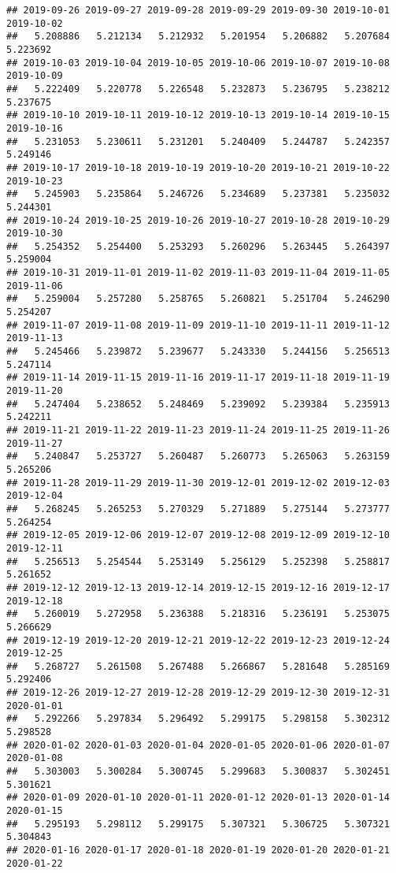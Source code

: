 \documentclass[
]{article}
\begin{document}
\begin{verbatim}
## 2019-09-26 2019-09-27 2019-09-28 2019-09-29 2019-09-30 2019-10-01 2019-10-02 
##   5.208886   5.212134   5.212932   5.201954   5.206882   5.207684   5.223692 
## 2019-10-03 2019-10-04 2019-10-05 2019-10-06 2019-10-07 2019-10-08 2019-10-09 
##   5.222409   5.220778   5.226548   5.232873   5.236795   5.238212   5.237675 
## 2019-10-10 2019-10-11 2019-10-12 2019-10-13 2019-10-14 2019-10-15 2019-10-16 
##   5.231053   5.230611   5.231201   5.240409   5.244787   5.242357   5.249146 
## 2019-10-17 2019-10-18 2019-10-19 2019-10-20 2019-10-21 2019-10-22 2019-10-23 
##   5.245903   5.235864   5.246726   5.234689   5.237381   5.235032   5.244301 
## 2019-10-24 2019-10-25 2019-10-26 2019-10-27 2019-10-28 2019-10-29 2019-10-30 
##   5.254352   5.254400   5.253293   5.260296   5.263445   5.264397   5.259004 
## 2019-10-31 2019-11-01 2019-11-02 2019-11-03 2019-11-04 2019-11-05 2019-11-06 
##   5.259004   5.257280   5.258765   5.260821   5.251704   5.246290   5.254207 
## 2019-11-07 2019-11-08 2019-11-09 2019-11-10 2019-11-11 2019-11-12 2019-11-13 
##   5.245466   5.239872   5.239677   5.243330   5.244156   5.256513   5.247114 
## 2019-11-14 2019-11-15 2019-11-16 2019-11-17 2019-11-18 2019-11-19 2019-11-20 
##   5.247404   5.238652   5.248469   5.239092   5.239384   5.235913   5.242211 
## 2019-11-21 2019-11-22 2019-11-23 2019-11-24 2019-11-25 2019-11-26 2019-11-27 
##   5.240847   5.253727   5.260487   5.260773   5.265063   5.263159   5.265206 
## 2019-11-28 2019-11-29 2019-11-30 2019-12-01 2019-12-02 2019-12-03 2019-12-04 
##   5.268245   5.265253   5.270329   5.271889   5.275144   5.273777   5.264254 
## 2019-12-05 2019-12-06 2019-12-07 2019-12-08 2019-12-09 2019-12-10 2019-12-11 
##   5.256513   5.254544   5.253149   5.256129   5.252398   5.258817   5.261652 
## 2019-12-12 2019-12-13 2019-12-14 2019-12-15 2019-12-16 2019-12-17 2019-12-18 
##   5.260019   5.272958   5.236388   5.218316   5.236191   5.253075   5.266629 
## 2019-12-19 2019-12-20 2019-12-21 2019-12-22 2019-12-23 2019-12-24 2019-12-25 
##   5.268727   5.261508   5.267488   5.266867   5.281648   5.285169   5.292406 
## 2019-12-26 2019-12-27 2019-12-28 2019-12-29 2019-12-30 2019-12-31 2020-01-01 
##   5.292266   5.297834   5.296492   5.299175   5.298158   5.302312   5.298528 
## 2020-01-02 2020-01-03 2020-01-04 2020-01-05 2020-01-06 2020-01-07 2020-01-08 
##   5.303003   5.300284   5.300745   5.299683   5.300837   5.302451   5.301621 
## 2020-01-09 2020-01-10 2020-01-11 2020-01-12 2020-01-13 2020-01-14 2020-01-15 
##   5.295193   5.298112   5.299175   5.307321   5.306725   5.307321   5.304843 
## 2020-01-16 2020-01-17 2020-01-18 2020-01-19 2020-01-20 2020-01-21 2020-01-22 

\end{verbatim}
\end{document}
